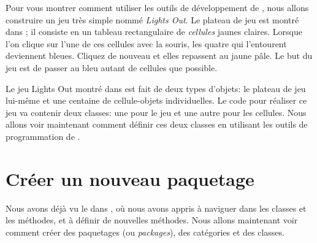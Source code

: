 \documentclass[a4paper,10pt,twoside]{book}
\begin{document}
Pour vous montrer comment utiliser les outils de développement de
\pharo, nous allons construire un jeu très simple nommé
\emph{Lights Out}.  Le plateau de jeu est montré dans
; il consiste en un tableau rectangulaire de
\emph{cellules} jaunes claires.  Lorsque l'on clique sur l'une de ces
cellules avec la souris, les quatre qui l'entourent deviennent
bleues. Cliquez de nouveau et elles repassent au jaune pâle. Le but du 
jeu est de passer au bleu autant de cellules que possible.

Le jeu Lights Out montré dans  est fait de deux types d'objets: le plateau de jeu lui-même et une centaine de cellule-objets individuelles. Le code \pharo pour réaliser ce jeu va contenir deux classes: une pour le jeu et une autre pour les cellules.
Nous allons voir maintenant comment définir ces deux classes en utilisant les outils de programmation de \pharo.

\section{Créer un nouveau paquetage}

Nous avons déjà vu le 
dans , où nous avons appris à naviguer dans les classes
et les méthodes, et à définir de nouvelles méthodes.
Nous allons maintenant voir comment créer des paquetages (ou \emph{packages}), des catégories et des classes.

\end{document}

